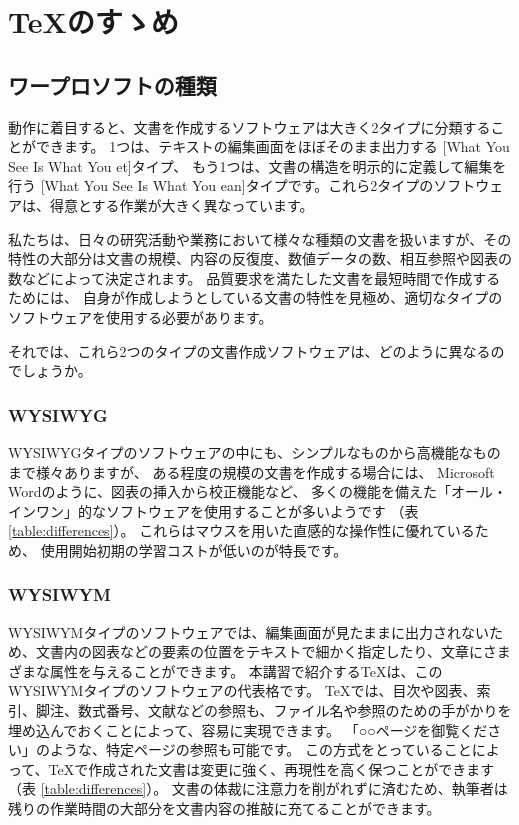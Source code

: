 \documentclass[TeXworkshop]{subfiles}
\begin{document}
\clearpage

\section{\TeX のすゝめ}
\subsection{ワープロソフトの種類}
動作に着目すると、文書を作成するソフトウェアは大きく2タイプに分類することができます。
1つは、テキストの編集画面をほぼそのまま出力する [What You See Is What You et]タイプ、
もう1つは、文書の構造を明示的に定義して編集を行う [What You See Is What You ean]タイプです。これら2タイプのソフトウェアは、得意とする作業が大きく異なっています。


私たちは、日々の研究活動や業務において様々な種類の文書を扱いますが、その特性の大部分は文書の規模、内容の反復度、数値データの数、相互参照や図表の数などによって決定されます。
品質要求を満たした文書を最短時間で作成するためには、
自身が作成しようとしている文書の特性を見極め、適切なタイプのソフトウェアを使用する必要があります。

それでは、これら2つのタイプの文書作成ソフトウェアは、どのように異なるのでしょうか。

\subsubsection{WYSIWYG}
WYSIWYGタイプのソフトウェアの中にも、シンプルなものから高機能なものまで様々ありますが、
ある程度の規模の文書を作成する場合には、
Microsoft Wordのように、図表の挿入から校正機能など、
多くの機能を備えた「オール・インワン」的なソフトウェアを使用することが多いようです
（表 \ref{table:differences}）。
これらはマウスを用いた直感的な操作性に優れているため、
使用開始初期の学習コストが低いのが特長です。


\subsubsection{WYSIWYM}
WYSIWYMタイプのソフトウェアでは、編集画面が見たままに出力されないため、文書内の図表などの要素の位置をテキストで細かく指定したり、文章にさまざまな属性を与えることができます。
本講習で紹介する\TeX は、このWYSIWYMタイプのソフトウェアの代表格です。
\TeX では、目次や図表、索引、脚注、数式番号、文献などの参照も、ファイル名や参照のための手がかりを埋め込んでおくことによって、容易に実現できます。
「○○ページを御覧ください」のような、特定ページの参照も可能です。
この方式をとっていることによって、\TeX で作成された文書は変更に強く、再現性を高く保つことができます（表 \ref{table:differences}）。 
文書の体裁に注意力を削がれずに済むため、執筆者は残りの作業時間の大部分を文書内容の推敲に充てることができます。
\end{document}
